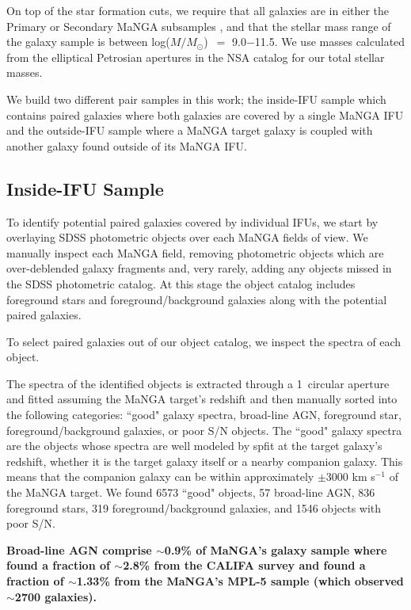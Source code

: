 \documentclass[iop,revtex4,twocolumn,apj,numberedappendix,appendixfloats]{emulateapj}
\newcommand{\logm}{log($M/M_{\odot}$)}
\begin{document}
On top of the star formation cuts, we require that all galaxies are in either the Primary or Secondary MaNGA subsamples \citep{Wake:2017}, and that the stellar mass range of the galaxy sample is between \logm\ $=$ 9.0$-$11.5. We use masses calculated from the elliptical Petrosian apertures in the NSA catalog for our total stellar masses. 

We build two different pair samples in this work; the inside-IFU sample which contains paired galaxies where both galaxies are covered by a single MaNGA IFU and the outside-IFU sample where a MaNGA target galaxy is coupled with another galaxy found outside of its MaNGA IFU. 

\subsection{Inside-IFU Sample}\label{sec:inside}

To identify potential paired galaxies covered by individual IFUs, we start by overlaying SDSS photometric objects over each MaNGA fields of view. We manually inspect each MaNGA field, removing photometric objects which are over-deblended galaxy fragments and, very rarely, adding any objects missed in the SDSS photometric catalog. At this stage the object catalog includes foreground stars and foreground/background galaxies along with the potential paired galaxies. 

To select paired galaxies out of our object catalog, we inspect the spectra of each object. 

The spectra of the identified objects is extracted through a 1\arcsec\ circular aperture and fitted assuming the MaNGA target's redshift and then manually sorted into the following categories: ``good" galaxy spectra, broad-line AGN, foreground star, foreground/background galaxies, or poor S/N objects. The ``good" galaxy spectra are the objects whose spectra are well modeled by {\sc spfit} at the target galaxy's redshift, whether it is the target galaxy itself or a nearby companion galaxy. This means that the companion galaxy can be within approximately $\pm$3000 km s$^{-1}$ of the MaNGA target. We found 6573 ``good" objects, 57 broad-line AGN, 836 foreground stars, 319 foreground/background galaxies, and 1546 objects with poor S/N. 

\textbf{Broad-line AGN comprise $\sim$0.9\% of MaNGA's galaxy sample where \citet{Lacerda:2020} found a fraction of $\sim$2.8\% from the CALIFA survey and \citet{Sanchez:2018} found a fraction of $\sim$1.33\% from the MaNGA's MPL-5 sample (which observed $\sim$2700 galaxies).  
}
\end{document}
